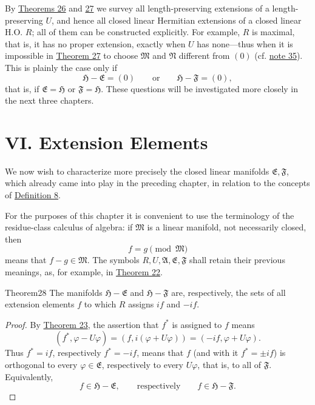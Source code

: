 ﻿\documentclass[paper=b5,fontsize=13pt,bookmarkpackage=false,twoside]{scrartcl}
\newcounter{translatornote}
\begin{document}
By \hyperref[thm:26]{Theorems 26} and \hyperref[thm:27]{27} we survey all length-preserving extensions of a length-preserving $U$, and hence all closed linear Hermitian extensions of a closed linear H.O. $R$; all of them can be constructed explicitly. For example, $R$ is maximal, that is, it has no proper extension, exactly when $U$ has none---thus when it is impossible in \hyperref[thm:27]{Theorem 27} to choose $\mathfrak M$ and $\mathfrak N$ different from $(0)$ (cf. \hyperref[fn:35]{note 35}). This is plainly the case only if
\[
\mathfrak H-\mathfrak E=(0)
\qquad\text{or}\qquad
\mathfrak H-\mathfrak F=(0),
\]
that is, if $\mathfrak E=\mathfrak H$ or $\mathfrak F=\mathfrak H$. These questions will be investigated more closely in the next three chapters.

\section*{VI. Extension Elements}\label{chap:VI}

We now wish to characterize more precisely the closed linear manifolds $\mathfrak E,\mathfrak F$, which already came into play in the preceding chapter, in relation to the concepts of \hyperref[def:8]{Definition 8}.

For the purposes of this chapter it is convenient to use the terminology of the residue-class calculus of algebra: if $\mathfrak M$ is a linear manifold, not necessarily closed, then
\[
f=g\pmod{\mathfrak M}
\]
means that $f-g\in\mathfrak M$. The symbols $R,U,\mathfrak A,\mathfrak E,\mathfrak F$ shall retain their previous meanings, as, for example, in \hyperref[thm:22]{Theorem 22}.

\begin{namedstatement}{Theorem}{28}\label{thm:28}
The manifolds $\mathfrak H-\mathfrak E$ and $\mathfrak H-\mathfrak F$ are, respectively, the sets of all extension elements $f$ to which $R$ assigns $if$ and $-if$.
\end{namedstatement}

\begin{proof}
By \hyperref[thm:23]{Theorem 23}, the assertion that $f^*$ is assigned to $f$ means
\[
(f^*,\varphi-U\varphi)
=(f,i(\varphi+U\varphi))
=(-if,\varphi+U\varphi).
\]
Thus $f^*=if$, respectively $f^*=-if$, means that $f$ (and with it $f^*=\pm if$) is orthogonal to every $\varphi\in\mathfrak E$, respectively to every $U\varphi$, that is, to all of $\mathfrak F$. Equivalently,
\[
f\in\mathfrak H-\mathfrak E,
\qquad\text{respectively}\qquad
f\in\mathfrak H-\mathfrak F.
\]
\end{proof}
\end{document}
